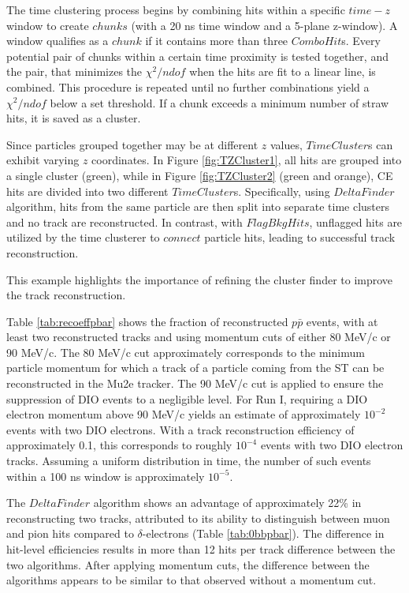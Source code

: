 The time clustering process begins 
by combining hits within a specific $time-z$ 
window to create $chunks$ (with a 
20 ns time window and a 5-plane z-window). 
A window qualifies as a $chunk$ if 
it contains more than three $ComboHit$s. 
Every potential pair of chunks 
within a certain time 
proximity is tested together, 
and the pair, that minimizes 
the $\chi^2/ndof$ when the hits 
are fit to a linear line, 
is combined. This procedure is 
repeated until no further combinations 
yield a $\chi^2/ndof$ below a set 
threshold. If a chunk 
exceeds a minimum number of straw 
hits, it is saved as a cluster.

Since particles grouped together 
may be at different $z$ values, 
$TimeCluster$s can exhibit varying 
$z$ coordinates. In Figure \ref{fig:TZCluster1}, 
all hits are grouped into a single cluster (green), 
while in Figure \ref{fig:TZCluster2} 
(green and orange), CE hits are divided into 
two different $TimeCluster$s.  
Specifically, using $DeltaFinder$ algorithm, hits from the same 
particle are then split into separate time clusters and no 
track are reconstructed. In contrast, 
with $FlagBkgHits$, unflagged hits are utilized by the 
time clusterer to $connect$ particle hits, 
leading to successful track reconstruction. 

This example highlights the importance of refining 
the cluster finder to improve the track reconstruction.


Table \ref{tab:recoeffpbar} shows the fraction of reconstructed $p\bar{p}$ events, 
with at least two reconstructed tracks and using momentum cuts of either 80 MeV/c or 90 MeV/c. The 80 
MeV/c cut approximately corresponds to the minimum particle momentum for which 
a track of a particle coming from the ST can be reconstructed 
in the Mu2e tracker. The 90 MeV/c cut is applied to ensure the 
suppression of DIO events to a negligible level. 
For Run I, requiring a DIO electron momentum above 90 MeV/c 
yields an estimate of approximately $10^{-2}$ events with 
two DIO electrons. With a track reconstruction efficiency of 
approximately 0.1, this corresponds to roughly $10^{-4}$ events with two 
DIO electron tracks. Assuming a uniform distribution in time, the number of such events within a 
100 ns window is approximately $10^{-5}$.

The $DeltaFinder$ algorithm shows an advantage of 
approximately 22\% in reconstructing 
two tracks, attributed to its ability to distinguish between 
muon and pion hits compared to $\delta$-electrons (Table \ref{tab:0bbpbar}). 
The difference in hit-level efficiencies results in more 
than 12 hits per track difference between the two algorithms. After 
applying momentum cuts, the difference between the algorithms 
appears to be similar to that observed without a momentum cut.


